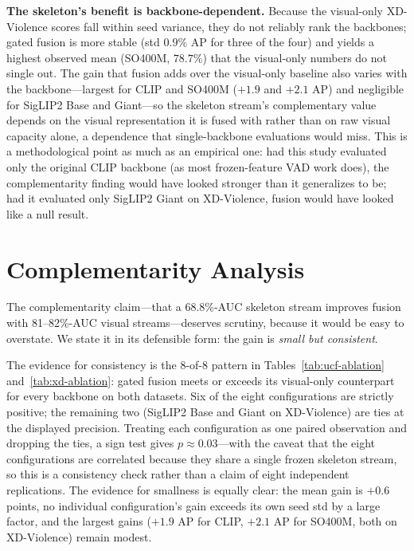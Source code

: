 \textbf{The skeleton's benefit is backbone-dependent.} Because the visual-only
XD-Violence scores fall within seed variance, they do not reliably rank the
backbones; gated fusion is more stable (std $0.9$\% AP for three of the four)
and yields a highest observed mean (SO400M, $78.7$\%) that the visual-only
numbers do not single out. The gain that fusion adds over the visual-only baseline also
varies with the backbone---largest for CLIP and SO400M ($+1.9$ and $+2.1$ AP)
and negligible for SigLIP2 Base and Giant---so the skeleton stream's
complementary value depends on the visual representation it is fused with
rather than on raw visual capacity alone, a dependence that single-backbone
evaluations would miss. This is a methodological point as much as an empirical
one: had this study evaluated only the original CLIP backbone (as most
frozen-feature VAD work does), the complementarity finding would have looked
stronger than it generalizes to be; had it evaluated only SigLIP2 Giant on
XD-Violence, fusion would have looked like a null result.

\section{Complementarity Analysis}
\label{sec:complementarity}

The complementarity claim---that a 68.8\%-AUC skeleton stream improves
fusion with 81--82\%-AUC visual streams---deserves scrutiny, because it would
be easy to overstate. We state it in its defensible form: the gain is
\emph{small but consistent}.

The evidence for consistency is the 8-of-8 pattern in
Tables~\ref{tab:ucf-ablation} and~\ref{tab:xd-ablation}: gated fusion meets or
exceeds its visual-only counterpart for every backbone on both datasets. Six
of the eight configurations are strictly positive; the remaining two (SigLIP2
Base and Giant on XD-Violence) are ties at the displayed precision. Treating
each configuration as one paired observation and dropping the ties, a sign
test gives $p\approx0.03$---with the caveat that the eight configurations
are correlated because they share
a single frozen skeleton stream, so this is a consistency check rather than a
claim of eight independent replications. The evidence for smallness is equally
clear: the mean gain is $+0.6$ points, no individual configuration's gain
exceeds its own seed std by a large factor, and the largest gains ($+1.9$ AP
for CLIP, $+2.1$ AP for SO400M, both on XD-Violence) remain modest.


